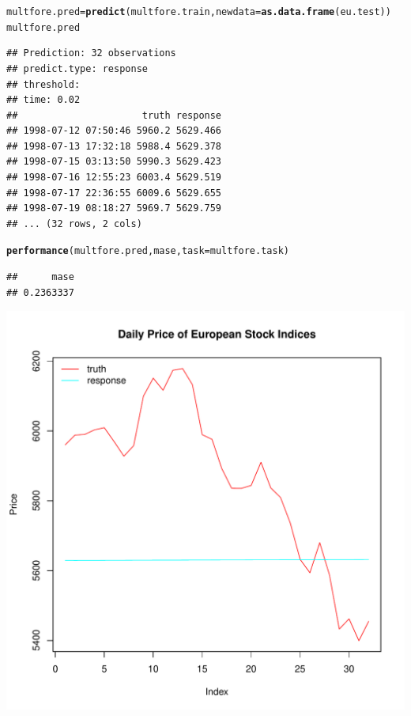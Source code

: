 \documentclass[12pt]{article}\usepackage[]{graphicx}\usepackage[]{color}
\makeatletter
\def\maxwidth{ %
  \ifdim\Gin@nat@width>\linewidth
    \linewidth
  \else
    \Gin@nat@width
  \fi
}
\newcommand{\hlstd}[1]{\textcolor[rgb]{0.345,0.345,0.345}{#1}}%
\newcommand{\hlkwb}[1]{\textcolor[rgb]{0.69,0.353,0.396}{#1}}%
\newcommand{\hlkwc}[1]{\textcolor[rgb]{0.333,0.667,0.333}{#1}}%
\newcommand{\hlkwd}[1]{\textcolor[rgb]{0.737,0.353,0.396}{\textbf{#1}}}%
\newenvironment{kframe}{%
 \def\at@end@of@kframe{}%
 \ifinner\ifhmode%
  \def\at@end@of@kframe{\end{minipage}}%
  \begin{minipage}{\columnwidth}%
 \fi\fi%
 \def\FrameCommand##1{\hskip\@totalleftmargin \hskip-\fboxsep
 \colorbox{shadecolor}{##1}\hskip-\fboxsep
     \hskip-\linewidth \hskip-\@totalleftmargin \hskip\columnwidth}%
 \MakeFramed {\advance\hsize-\width
   \@totalleftmargin\z@ \linewidth\hsize
   \@setminipage}}%
 {\par\unskip\endMakeFramed%
 \at@end@of@kframe}
\newenvironment{knitrout}{}{} %
\theoremstyle{definition}
\makeatother
\begin{document}
\begin{knitrout}
\color{fgcolor}\begin{kframe}
\begin{alltt}
\hlstd{multfore.pred} \hlkwb{=} \hlkwd{predict}\hlstd{(multfore.train,} \hlkwc{newdata} \hlstd{=} \hlkwd{as.data.frame}\hlstd{(eu.test))}
\hlstd{multfore.pred}
\end{alltt}
\begin{verbatim}
## Prediction: 32 observations
## predict.type: response
## threshold: 
## time: 0.02
##                      truth response
## 1998-07-12 07:50:46 5960.2 5629.466
## 1998-07-13 17:32:18 5988.4 5629.378
## 1998-07-15 03:13:50 5990.3 5629.423
## 1998-07-16 12:55:23 6003.4 5629.519
## 1998-07-17 22:36:55 6009.6 5629.655
## 1998-07-19 08:18:27 5969.7 5629.759
## ... (32 rows, 2 cols)
\end{verbatim}
\begin{alltt}
\hlkwd{performance}\hlstd{(multfore.pred, mase,} \hlkwc{task} \hlstd{= multfore.task)}
\end{alltt}
\begin{verbatim}
##      mase 
## 0.2363337
\end{verbatim}
\end{kframe}
\end{knitrout}
\doublespacing
\begin{knitrout}
\color{fgcolor}
\includegraphics[width=\maxwidth]{figure/multiForecast8-1} 

\end{knitrout}
\end{document}
